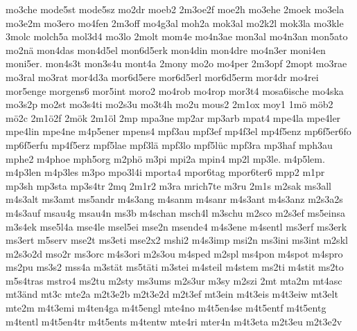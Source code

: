 {    mo3che
    mode5st
    mode5sz
    mo2dr
    moeb2
    2m3oe2f
    moe2h
    mo3ehe
    2moek
    mo3ela
    mo3e2m
    mo3ero
    mo4fen
    2m3off
    mo4g3al
    moh2a
    mok3al
    mo2k2l
    mok3la
    mo3kle
    3molc
    molch5a
    mol3d4
    mo3lo
    2molt
    mom4e
    mo4n3ae
    mon3al
    mo4n3an
    mon5ato
    mo2nä
    mon4das
    mon4d5el
    mon6d5erk
    mon4din
    mon4dre
    mo4n3er
    moni4en
    moni5er.
    mon4s3t
    mon3s4u
    mont4a
    2mony
    mo2o
    mo4per
    2m3opf
    2mopt
    mo3rae
    mo3ral
    mo3rat
    mor4d3a
    mor6d5ere
    mor6d5erl
    mor6d5erm
    mor4dr
    mo4rei
    mor5enge
    morgens6
    mor5int
    moro2
    mo4rob
    mo4rop
    mor3t4
    mosa6ische
    mo4ska
    mo3s2p
    mo2st
    mo3s4ti
    mo2s3u
    mo3t4h
    mo2u
    mous2
    2m1ox
    moy1
    1mö
    möb2
    mö2c
    2m1ö2f
    2mök
    2m1öl
    2mp
    mpa3ne
    mp2ar
    mp3arb
    mpat4
    mpe4la
    mpe4ler
    mpe4lin
    mpe4ne
    m4p5ener
    mpens4
    mpf3au
    mpf3ef
    mp4f3el
    mp4f5enz
    mp6f5er6fo
    mp6f5erfu
    mp4f5erz
    mpf5lae
    mpf3lä
    mpf3lo
    mpf5lüc
    mpf3ra
    mp3haf
    mph3au
    mphe2
    m4phoe
    mph5org
    m2phö
    m3pi
    mpi2a
    mpin4
    mp2l
    mp3le.
    m4p5lem.
    m4p3len
    m4p3les
    m3po
    mpo3l4i
    mporta4
    mpor6tag
    mpor6ter6
    mpp2
    m1pr
    mp3sh
    mp3sta
    mp3s4tr
    2mq
    2m1r2
    m3ra
    mrich7te
    m3ru
    2m1s
    m2sak
    ms3all
    m4s3alt
    ms3amt
    ms5andr
    m4s3ang
    m4sanm
    m4sanr
    m4s3ant
    m4s3anz
    m2s3a2s
    m4s3auf
    msau4g
    msau4n
    ms3b
    m4schan
    msch4l
    m3schu
    m2sco
    m2s3ef
    ms5einsa
    m3s4ek
    mse5l4a
    mse4le
    msel5ei
    mse2n
    msende4
    m4s3ene
    m4sentl
    ms3erf
    ms3erk
    ms3ert
    m5serv
    mse2t
    ms3eti
    mse2x2
    mshi2
    m4s3imp
    msi2n
    ms3ini
    ms3int
    m2skl
    m2s3o2d
    mso2r
    ms3orc
    m4s3ori
    m2s3ou
    m4sped
    m2spl
    ms4pon
    m4spot
    m4spro
    ms2pu
    ms3s2
    mss4a
    m3stät
    ms5täti
    m3stei
    m4steil
    m4stem
    ms2ti
    m4stit
    ms2to
    m5s4tras
    mstro4
    ms2tu
    m2sty
    ms3ums
    m2s3ur
    m3sy
    m2szi
    2mt
    mta2m
    mt4asc
    mt3änd
    mt3c
    mte2a
    m2t3e2b
    m2t3e2d
    m2t3ef
    mt3ein
    m4t3eis
    m4t3eiw
    mt3elt
    mte2m
    m4t3emi
    m4ten4ga
    m4t5engl
    mte4no
    m4t5en4se
    m4t5entf
    m4t5entg
    m4tentl
    m4t5en4tr
    m4t5ents
    m4tentw
    mte4ri
    mter4n
    m4t3eta
    m2t3eu
    m2t3e2v
}
